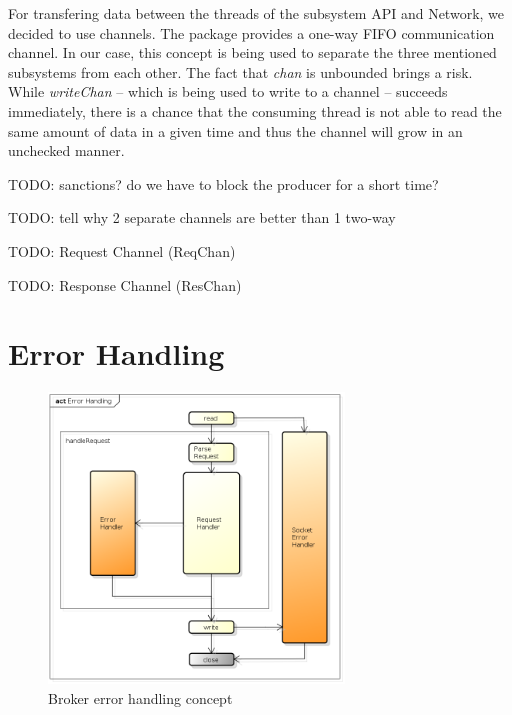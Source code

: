 For transfering data between the threads of the subsystem API and Network, we
decided to use channels. The
package provides a one-way FIFO communication channel. In
our case, this concept is being used to separate the
three mentioned subsystems from each other. The fact that
\textit{chan} is unbounded brings a risk. While
\textit{writeChan} -- which is being used to write to a
channel -- succeeds immediately, there is a chance that the
consuming thread is not able to read the same amount of
data in a given time and thus the channel will grow in
an unchecked manner. \cite{o2008real}

TODO: sanctions? do we have to block the producer for a short time?

TODO: tell why 2 separate channels are better than 1 two-way

TODO: Request Channel (ReqChan)

TODO: Response Channel (ResChan)

\section{Error Handling}

\begin{figure}[H]
    \centering
    \includegraphics[width=0.7\textwidth]{images/broker-error-activity.png}
    \caption{Broker error handling concept}
    \label{fig:broker-error-activity.png}
\end{figure}


